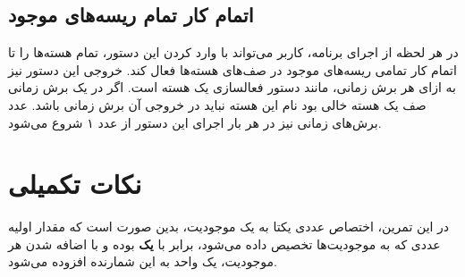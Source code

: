 \documentclass{utap}
\begin{document}
	\linespread{1.6}
	\begin{latin}%
		\centering
		\begin{minipage}[t]{1\textwidth}
			{}
			{}
			{}
		\end{minipage}%
	\end{latin}

	\subsection{اتمام کار تمام ریسه‌های موجود}
	\hspace{5mm}
	در هر لحظه از اجرای برنامه، کاربر می‌تواند با وارد کردن این دستور، تمام هسته‌ها را تا اتمام کار تمامی ریسه‌های موجود در صف‌ها‌ی هسته‌ها فعال کند.
	خروجی این دستور نیز به ازای هر برش زمانی، مانند دستور فعالسازی یک هسته است. اگر در یک برش زمانی صف یک هسته خالی بود نام این هسته نباید در خروجی آن برش زمانی باشد. عدد برش‌های زمانی نیز در هر بار اجرای این دستور از عدد ۱ شروع می‌شود.
	
	\linespread{1.6}
	\begin{latin}%
		\centering
		\begin{minipage}[t]{1\textwidth}
			{}
			{}
		\end{minipage}%
	\end{latin}
	
	\section{نکات تکمیلی}
	\hspace{5mm}
	در این تمرین، اختصاص عددی یکتا به یک موجودیت‌،‌ بدین صورت است که مقدار اولیه عددی که به موجودیت‌ها تخصیص داده می‌شود، برابر با \textbf{یک} بوده و با اضافه شدن هر موجودیت، یک واحد به این شمارنده افزوده می‌شود.
	
\end{document}

